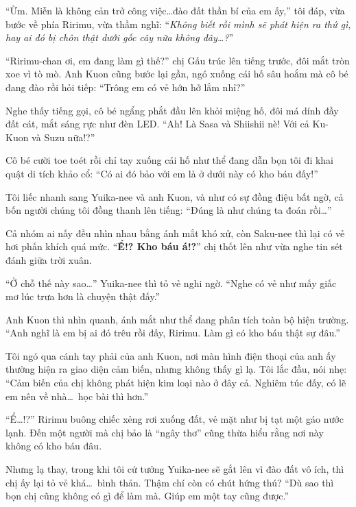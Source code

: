 \documentclass[../main.tex]{subfiles}
\begin{document}
``Ừm. Miễn là không cản trở công việc\dots đào đất thần bí của em ấy,'' tôi đáp, vừa bước về phía Ririmu, vừa thầm nghĩ: ``\textit{Không biết rồi mình sẽ phát hiện ra thứ gì, hay ai đó bị chôn thật dưới gốc cây nữa không đây\dots?}''

\ct

``Ririmu-chan ơi, em đang làm gì thế?'' chị Gấu trúc lên tiếng trước, đôi mắt tròn xoe vì tò mò. Anh Kuon cũng bước lại gần, ngó xuống cái hố sâu hoắm mà cô bé đang đào rồi hỏi tiếp: ``Trông em có vẻ hớn hở lắm nhỉ?''


Nghe thấy tiếng gọi, cô bé ngẩng phắt đầu lên khỏi miệng hố, đôi má dính đầy đất cát, mắt sáng rực như đèn LED. ``Ah! Là Sasa và Shiishii nè! Với cả Ku-Kuon và Suzu nữa!?''

Cô bé cười toe toét rồi chỉ tay xuống cái hố như thể đang dẫn bọn tôi đi khai quật di tích khảo cổ: ``Có ai đó bảo với em là ở dưới này có kho báu đấy!''


Tôi liếc nhanh sang Yuika-nee và anh Kuon, và như có sự đồng điệu bất ngờ, cả bốn người chúng tôi đồng thanh lên tiếng: ``Đúng là như chúng ta đoán rồi\dots''

Cả nhóm ai nấy đều nhìn nhau bằng ánh mắt khó xử, còn Saku-nee thì lại có vẻ hơi phấn khích quá mức. ``\textbf{Ể!? Kho báu á!?}'' chị thốt lên như vừa nghe tin sét đánh giữa trời xuân.

``Ở chỗ thế này sao\dots'' Yuika-nee thì tỏ vẻ nghi ngờ. ``Nghe có vẻ như mấy giấc mơ lúc trưa hơn là chuyện thật đấy.''

Anh Kuon thì nhìn quanh, ánh mắt như thể đang phân tích toàn bộ hiện trường. ``Anh nghĩ là em bị ai đó trêu rồi đấy, Ririmu. Làm gì có kho báu thật sự đâu.''

Tôi ngó qua cánh tay phải của anh Kuon, nơi màn hình điện thoại của anh ấy thường hiện ra giao diện cảm biến, nhưng không thấy gì lạ. Tôi lắc đầu, nói nhẹ: ``Cảm biến của chị không phát hiện kim loại nào ở đây cả. Nghiêm túc đấy, có lẽ em nên về nhà\dots\ học bài thì hơn.''

``Ể\dots!?'' Ririmu buông chiếc xẻng rơi xuống đất, vẻ mặt như bị tạt một gáo nước lạnh. Đến một người mà chị bảo là ``ngây thơ'' cũng thừa hiểu rằng nơi này không có kho báu đâu.

Nhưng lạ thay, trong khi tôi cứ tưởng Yuika-nee sẽ gắt lên vì đào đất vô ích, thì chị ấy lại tỏ vẻ khá\dots\ bình thản. Thậm chí còn có chút hứng thú? ``Dù sao thì bọn chị cũng không có gì để làm mà. Giúp em một tay cũng được.''
\end{document}

